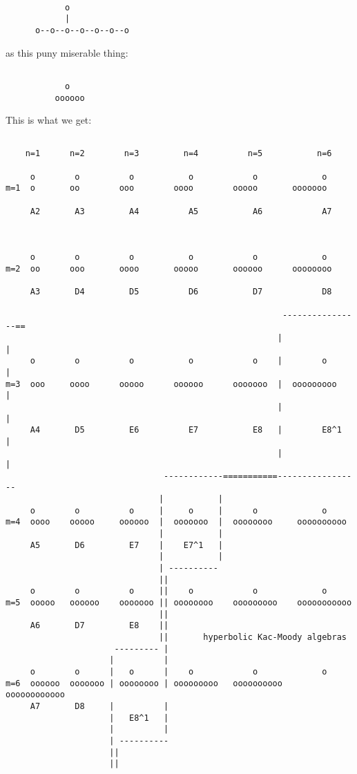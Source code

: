 \begin{verbatim}

            o
            |
      o--o--o--o--o--o--o
\end{verbatim}
    
as this puny miserable thing:


\begin{verbatim}

            o
          oooooo
\end{verbatim}
    
This is what we get:


\begin{verbatim}

    n=1      n=2        n=3         n=4          n=5           n=6

     o        o          o           o            o             o   
m=1  o       oo        ooo        oooo        ooooo       ooooooo
    
     A2       A3         A4          A5           A6            A7

 

     o        o          o           o            o             o   
m=2  oo      ooo       oooo       ooooo       oooooo      oooooooo

     A3       D4         D5          D6           D7            D8

                                                        ----------------==
                                                       |               |
     o        o          o           o            o    |        o      |
m=3  ooo     oooo      ooooo      oooooo      ooooooo  |  ooooooooo    |
                                                       |               |
     A4       D5         E6          E7           E8   |        E8^1   |
                                                       |               |
                                ------------===========-----------------
                               |           |
     o        o          o     |     o     |      o             o   
m=4  oooo    ooooo     oooooo  |  ooooooo  |  oooooooo     oooooooooo
                               |           |
     A5       D6         E7    |    E7^1   |       
                               |           |
                               | ----------
                               ||
     o        o          o     ||    o            o             o   
m=5  ooooo   oooooo    ooooooo || oooooooo    ooooooooo    ooooooooooo
                               ||
     A6       D7         E8    ||   
                               ||       hyperbolic Kac-Moody algebras
                      --------- |         
                     |          |
     o        o      |   o      |    o            o             o   
m=6  oooooo  ooooooo | oooooooo | ooooooooo   oooooooooo   oooooooooooo  
     A7       D8     |          |
                     |   E8^1   |
                     |          |
                     | ----------
                     ||
                     ||
\end{verbatim}
    
